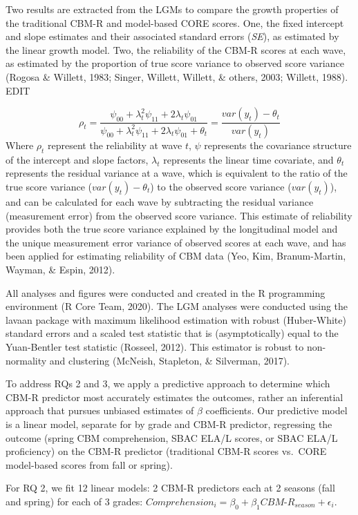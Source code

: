 \documentclass[
  english,
  man, fleqn, noextraspace]{apa6}
\begin{document}
Two results are extracted from the LGMs to compare the growth properties of the traditional CBM-R and model-based CORE scores. One, the fixed intercept and slope estimates and their associated standard errors (\emph{SE}), as estimated by the linear growth model. Two, the reliability of the CBM-R scores at each wave, as estimated by the proportion of true score variance to observed score variance (Rogosa \& Willett, 1983; Singer, Willett, Willett, \& others, 2003; Willett, 1988). EDIT

\[
\rho_t = \frac{\psi_{00} + \lambda^2_t \psi_{11} + 2\lambda_t \psi_{01}}{\psi_{00} + \lambda^2_t \psi_{11} + 2\lambda_t \psi_{01} + \theta_t} = \frac{var(y_t) - \theta_t}{var(y_t)} 
\]
Where \(\rho_t\) represent the reliability at wave \(t\), \(\psi\) represents the covariance structure of the intercept and slope factors, \(\lambda_t\) represents the linear time covariate, and \(\theta_t\) represents the residual variance at a wave, which is equivalent to the ratio of the true score variance (\(var(y_t) - \theta_t\)) to the observed score variance (\(var(y_t)\)), and can be calculated for each wave by subtracting the residual variance (measurement error) from the observed score variance. This estimate of reliability provides both the true score variance explained by the longitudinal model and the unique measurement error variance of observed scores at each wave, and has been applied for estimating reliability of CBM data (Yeo, Kim, Branum-Martin, Wayman, \& Espin, 2012).

All analyses and figures were conducted and created in the R programming environment (R Core Team, 2020). The LGM analyses were conducted using the lavaan package with maximum likelihood estimation with robust (Huber-White) standard errors and a scaled test statistic that is (asymptotically) equal to the Yuan-Bentler test statistic (Rosseel, 2012). This estimator is robust to non-normality and clustering (McNeish, Stapleton, \& Silverman, 2017).

To address RQs 2 and 3, we apply a predictive approach to determine which CBM-R predictor most accurately estimates the outcomes, rather an inferential approach that pursues unbiased estimates of \(\beta\) coefficients. Our predictive model is a linear model, separate for by grade and CBM-R predictor, regressing the outcome (spring CBM comprehension, SBAC ELA/L scores, or SBAC ELA/L proficiency) on the CBM-R predictor (traditional CBM-R scores vs.~CORE model-based scores from fall or spring).

For RQ 2, we fit 12 linear models: 2 CBM-R predictors each at 2 seasons (fall and spring) for each of 3 grades: \(Comprehension_i = \beta_0 + \beta_1CBM\mbox{-}R_{season} + \epsilon_i\).
\end{document}
